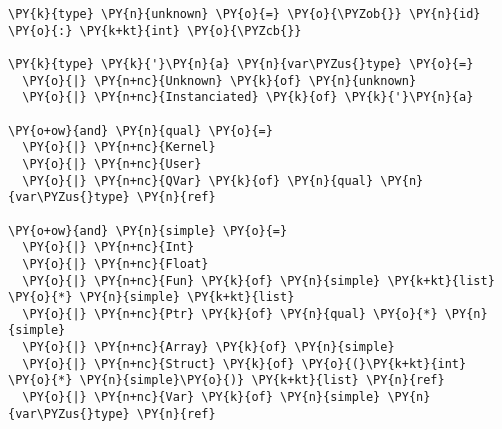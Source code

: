 \begin{Verbatim}[commandchars=\\\{\}]
\PY{k}{type} \PY{n}{unknown} \PY{o}{=} \PY{o}{\PYZob{}} \PY{n}{id} \PY{o}{:} \PY{k+kt}{int} \PY{o}{\PYZcb{}}

\PY{k}{type} \PY{k}{'}\PY{n}{a} \PY{n}{var\PYZus{}type} \PY{o}{=}
  \PY{o}{|} \PY{n+nc}{Unknown} \PY{k}{of} \PY{n}{unknown}
  \PY{o}{|} \PY{n+nc}{Instanciated} \PY{k}{of} \PY{k}{'}\PY{n}{a}

\PY{o+ow}{and} \PY{n}{qual} \PY{o}{=}
  \PY{o}{|} \PY{n+nc}{Kernel}
  \PY{o}{|} \PY{n+nc}{User}
  \PY{o}{|} \PY{n+nc}{QVar} \PY{k}{of} \PY{n}{qual} \PY{n}{var\PYZus{}type} \PY{n}{ref}

\PY{o+ow}{and} \PY{n}{simple} \PY{o}{=}
  \PY{o}{|} \PY{n+nc}{Int}
  \PY{o}{|} \PY{n+nc}{Float}
  \PY{o}{|} \PY{n+nc}{Fun} \PY{k}{of} \PY{n}{simple} \PY{k+kt}{list} \PY{o}{*} \PY{n}{simple} \PY{k+kt}{list}
  \PY{o}{|} \PY{n+nc}{Ptr} \PY{k}{of} \PY{n}{qual} \PY{o}{*} \PY{n}{simple}
  \PY{o}{|} \PY{n+nc}{Array} \PY{k}{of} \PY{n}{simple}
  \PY{o}{|} \PY{n+nc}{Struct} \PY{k}{of} \PY{o}{(}\PY{k+kt}{int} \PY{o}{*} \PY{n}{simple}\PY{o}{)} \PY{k+kt}{list} \PY{n}{ref}
  \PY{o}{|} \PY{n+nc}{Var} \PY{k}{of} \PY{n}{simple} \PY{n}{var\PYZus{}type} \PY{n}{ref}
\end{Verbatim}
